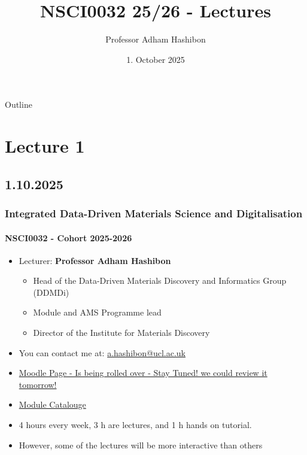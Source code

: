 \documentclass[aspectratio=169]{beamer}
\title[NSCI0032-25/26]{NSCI0032 25/26 - Lectures}
\author[A. Hashibon]{Professor Adham Hashibon}
\institute[UCL]{%
 Institute for Materials Discovery \\ %
  UCL
}
\date{1. October 2025}
\begin{document}
\begin{frame}
  \titlepage%
\end{frame}

\begin{frame}{Outline}
  \tableofcontents
\end{frame}

\section{Lecture 1  }
\subsection{1.10.2025}

\begin{frame}
  \frametitle{Integrated Data-Driven Materials Science and Digitalisation}
  \framesubtitle{NSCI0032 - Cohort 2025-2026 }
  \begin{itemize}
    \item Lecturer: {\bf Professor Adham Hashibon} 
      \begin{itemize}
        \item Head of the Data-Driven Materials Discovery and Informatics Group (DDMDi) 
        \item Module and AMS Programme lead 
        \item Director of the Institute for Materials Discovery 
      \end{itemize}
    \item You can contact me at: \href{mailto://a.hashibon@ucl.ac.uk}{a.hashibon@ucl.ac.uk}
    \item \href{https://moodle.ucl.ac.uk/course/view.php?id=47590}{Moodle Page - Is being rolled over - Stay Tuned! we could review it tomorrow!}
    \item \href{https://www.ucl.ac.uk/module-catalogue/modules/integrated-data-driven-materials-science-and-digitalisation-NSCI0032}{Module Catalouge}  
    \item 4 hours every week,  3 h are lectures, and 1 h hands on tutorial.
    \pause%
  \item \alert{However}, some of the lectures will be more interactive than others
  \end{itemize}
\end{frame}
\end{document}
